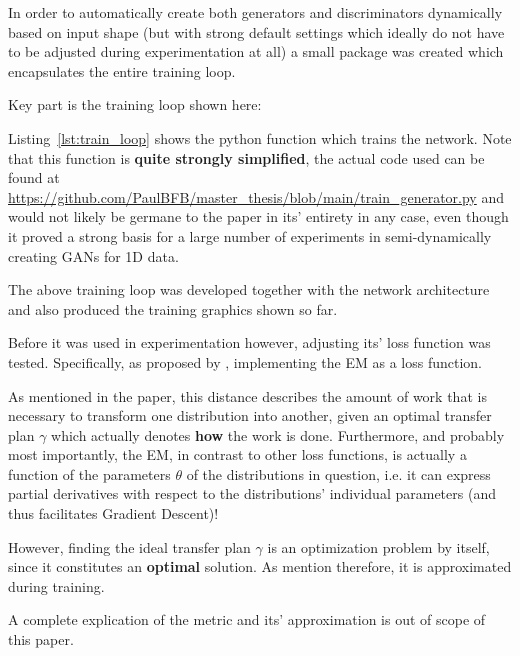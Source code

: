 In order to automatically create both generators and discriminators dynamically based on input shape (but with strong default settings which ideally do not have to be adjusted during experimentation at all) a small package was created which encapsulates the entire training loop.

Key part is the training loop shown here:

\newpage



Listing~\ref{lst:train_loop} shows the python function which trains the network. Note that this function is \textbf{quite strongly simplified}, 
the actual code used can be found at \url{https://github.com/PaulBFB/master_thesis/blob/main/train_generator.py} and would not likely be germane to the paper in its' entirety in any case, even though it proved a strong basis for a large number of experiments in semi-dynamically creating \acp{GAN} for 1D data.

\pagebreak

The above training loop was developed together with the network architecture and also produced the training graphics shown so far. 

Before it was used in experimentation however, adjusting its' loss function was tested.
Specifically, as proposed by \cite{arjovsky2017wasserstein}, implementing the \ac{EM} as a loss function. 


As mentioned in the paper, this distance describes the amount of work that is necessary to transform one distribution into another, given an optimal transfer plan $\gamma$ which actually denotes \textbf{how} the work is done.
Furthermore, and probably most importantly, the \ac{EM}, in contrast to other loss functions, is actually a function of the parameters $\theta$ of the distributions in question, i.e. it can express partial derivatives with respect to the distributions' individual parameters (and thus facilitates Gradient Descent)!

However, finding the ideal transfer plan $\gamma$ is an optimization problem by itself, since it constitutes an \textbf{optimal} solution. As \cite{arjovsky2017wasserstein} mention therefore, it is approximated during training.

A complete explication of the metric and its' approximation is out of scope of this paper.

